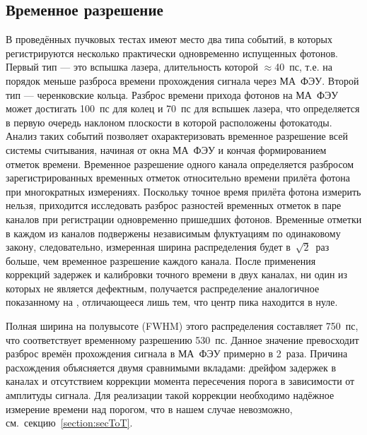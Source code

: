 \subsection{Временное разрешение}\label{section:TimeRes}

В проведённых пучковых тестах имеют место два типа событий, в которых регистрируются несколько практически одновременно испущенных фотонов. Первый тип --- это вспышка лазера, длительность которой $\approx$40~пс, т.е. на порядок меньше разброса времени прохождения сигнала через МА~ФЭУ. Второй тип --- черенковские кольца. Разброс времени прихода фотонов на МА~ФЭУ может достигать 100~пс для колец и 70~пс для вспышек лазера, что определяется в первую очередь наклоном плоскости в которой расположены фотокатоды. Анализ таких событий позволяет охарактеризовать временное разрешение всей системы считывания, начиная от окна МА~ФЭУ и кончая формированием отметок времени. Временное разрешение одного канала определяется разбросом зарегистрированных временных отметок относительно времени прилёта фотона при многократных измерениях. Поскольку точное время прилёта фотона измерить нельзя, приходится исследовать разброс разностей временных отметок в паре каналов при регистрации одновременно пришедших фотонов. Временные отметки в каждом из каналов подвержены независимым флуктуациям по одинаковому закону, следовательно, измеренная ширина распределения будет в~$\sqrt 2$~раз больше, чем временное разрешение каждого канала.
После применения коррекций задержек и калибровки точного времени в двух каналах, ни один из которых не является дефектным, получается распределение аналогичное показанному на , отличающееся лишь тем, что центр пика находится в нуле.


Полная ширина на полувысоте (FWHM) этого распределения составляет 750~пс, что соответствует временному разрешению 530~пс. Данное значение превосходит разброс времён прохождения сигнала в МА~ФЭУ примерно в 2~раза. Причина расхождения объясняется двумя сравнимыми вкладами: дрейфом задержек в каналах и отсутствием коррекции момента пересечения порога в зависимости от амплитуды сигнала. Для реализации такой коррекции необходимо надёжное измерение времени над порогом, что в нашем случае невозможно, см.~секцию~\ref{section:secToT}.

